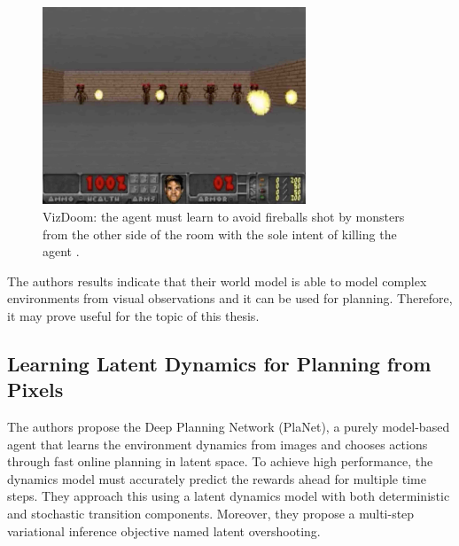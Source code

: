 \begin{figure}[H]
\includegraphics[width=0.7\textwidth,keepaspectratio]{figures/VizDoom.png}
\caption[VizDoom]{VizDoom: the agent must learn to avoid fireballs shot by monsters from the other side of the room with the sole intent of killing the agent \protect\cite{Algo.WorldModels}.}
\label{Fig.VizDoom}
\end{figure}

 The authors results indicate that their world model is able to model complex environments from visual observations and it can be used for planning. Therefore, it may prove useful for the topic of this thesis.

\subsection{Learning Latent Dynamics for Planning from Pixels}

 The authors propose the Deep Planning Network \cite{Algo.PlaNet} (PlaNet), a purely model-based agent that learns the environment dynamics from images and chooses actions through fast online planning in latent space. To achieve high performance, the dynamics model must accurately predict the rewards ahead for multiple time steps. They approach this using a latent dynamics model with both deterministic and stochastic transition components. Moreover, they propose a multi-step variational inference objective named latent overshooting.

